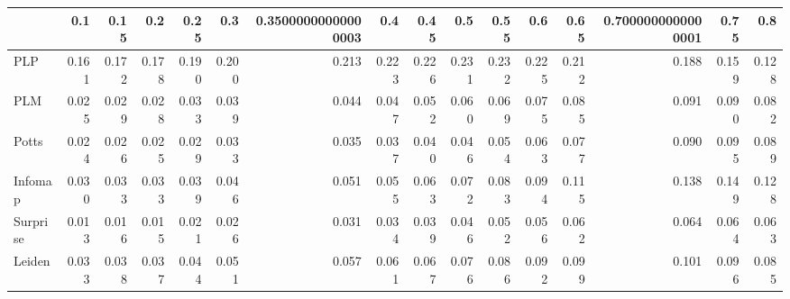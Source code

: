 \begin{tabular}{lrrrrrrrrrrrrrrr}
\toprule
{} &   0.1 &  0.15 &   0.2 &  0.25 &   0.3 & 0.35000000000000003 &   0.4 &  0.45 &   0.5 &  0.55 &   0.6 &  0.65 & 0.7000000000000001 &  0.75 &   0.8 \\
\midrule
PLP      & 0.161 & 0.172 & 0.178 & 0.190 & 0.200 &               0.213 & 0.223 & 0.226 & 0.231 & 0.232 & 0.225 & 0.212 &              0.188 & 0.159 & 0.128 \\
PLM      & 0.025 & 0.029 & 0.028 & 0.033 & 0.039 &               0.044 & 0.047 & 0.052 & 0.060 & 0.069 & 0.075 & 0.085 &              0.091 & 0.090 & 0.082 \\
Potts    & 0.024 & 0.026 & 0.025 & 0.029 & 0.033 &               0.035 & 0.037 & 0.040 & 0.046 & 0.054 & 0.063 & 0.077 &              0.090 & 0.095 & 0.089 \\
Infomap  & 0.030 & 0.033 & 0.033 & 0.039 & 0.046 &               0.051 & 0.055 & 0.063 & 0.072 & 0.083 & 0.094 & 0.115 &              0.138 & 0.149 & 0.128 \\
Surprise & 0.013 & 0.016 & 0.015 & 0.021 & 0.026 &               0.031 & 0.034 & 0.039 & 0.046 & 0.052 & 0.056 & 0.062 &              0.064 & 0.064 & 0.063 \\
Leiden   & 0.033 & 0.038 & 0.037 & 0.044 & 0.051 &               0.057 & 0.061 & 0.067 & 0.076 & 0.086 & 0.092 & 0.099 &              0.101 & 0.096 & 0.085 \\
\bottomrule
\end{tabular}

